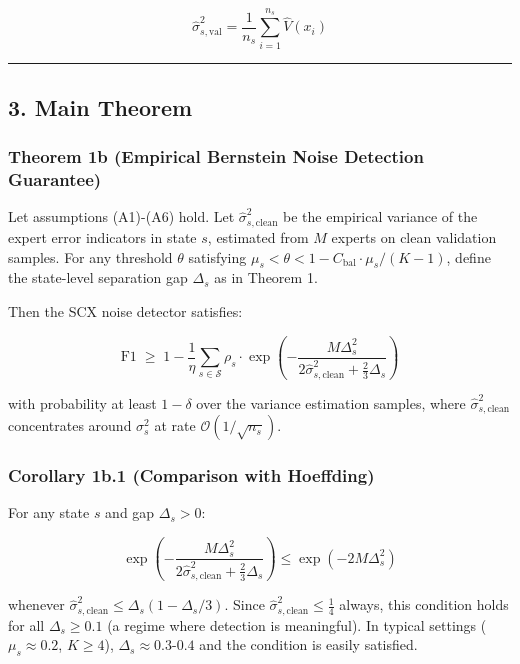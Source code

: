 \documentclass[
  12pt,
]{ctexart}
\begin{document}
\[\hat{\sigma}_{s,\text{val}}^2 = \frac{1}{n_s} \sum_{i=1}^{n_s} \hat{V}(x_i)\]

\begin{center}\rule{0.5\linewidth}{0.5pt}\end{center}

\subsection{3. Main Theorem}\label{main-theorem}

\subsubsection{Theorem 1b (Empirical Bernstein Noise Detection
Guarantee)}\label{theorem-1b-empirical-bernstein-noise-detection-guarantee}

Let assumptions (A1)-(A6) hold. Let \(\hat{\sigma}_{s,\text{clean}}^2\)
be the empirical variance of the expert error indicators in state \(s\),
estimated from \(M\) experts on clean validation samples. For any
threshold \(\theta\) satisfying
\(\mu_s < \theta < 1 - C_{\text{bal}} \cdot \mu_s/(K-1)\), define the
state-level separation gap \(\Delta_s\) as in Theorem 1.

Then the SCX noise detector satisfies:

\[\text{F1} \;\geq\; 1 - \frac{1}{\eta} \sum_{s \in \mathcal{S}} \rho_s \cdot \exp\!\left(-\frac{M\Delta_s^2}{2\hat{\sigma}_{s,\text{clean}}^2 + \frac{2}{3}\Delta_s}\right)\]

with probability at least \(1 - \delta\) over the variance estimation
samples, where \(\hat{\sigma}_{s,\text{clean}}^2\) concentrates around
\(\sigma_s^2\) at rate \(\mathcal{O}(1/\sqrt{n_s})\).

\subsubsection{Corollary 1b.1 (Comparison with
Hoeffding)}\label{corollary-1b.1-comparison-with-hoeffding}

For any state \(s\) and gap \(\Delta_s > 0\):

\[\exp\!\left(-\frac{M\Delta_s^2}{2\hat{\sigma}_{s,\text{clean}}^2 + \frac{2}{3}\Delta_s}\right) \leq \exp(-2M\Delta_s^2)\]

whenever
\(\hat{\sigma}_{s,\text{clean}}^2 \leq \Delta_s(1 - \Delta_s/3)\). Since
\(\hat{\sigma}_{s,\text{clean}}^2 \leq \frac{1}{4}\) always, this
condition holds for all \(\Delta_s \geq 0.1\) (a regime where detection
is meaningful). In typical settings (\(\mu_s \approx 0.2\),
\(K \geq 4\)), \(\Delta_s \approx 0.3\text{-}0.4\) and the condition is
easily satisfied.
\end{document}

